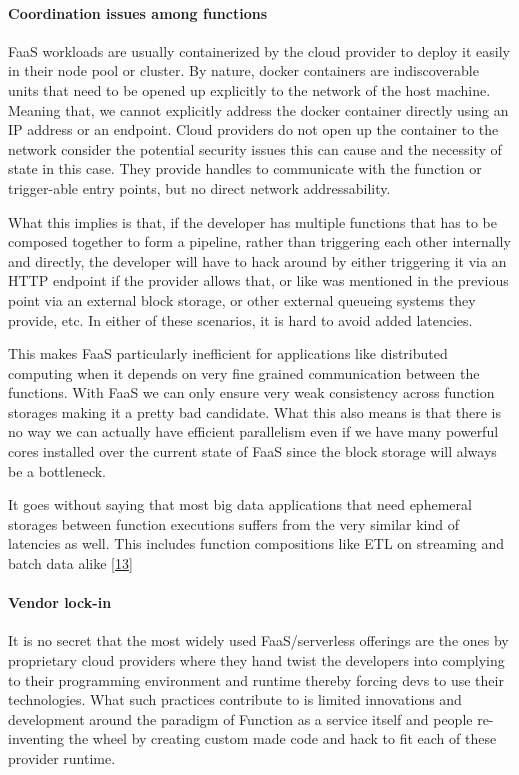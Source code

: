 \documentclass[12pt,titlepage]{article}
\begin{document}
\paragraph{Coordination issues among functions}
\label{sec:orgab8bd36}
FaaS workloads are usually containerized by
the cloud provider to deploy it easily in their node pool or cluster. By nature,
docker containers are indiscoverable units that need to be opened up explicitly
to the network of the host machine. Meaning that, we cannot explicitly address
the docker container directly using an IP address or an endpoint. Cloud
providers do not open up the container to the network consider the potential
security issues this can cause and the necessity of state in this case. They
provide handles to communicate with the function or trigger-able entry points,
but no direct network addressability.

What this implies is that, if the developer has multiple functions that has to
be composed together to form a pipeline, rather than triggering each other
internally and directly, the developer will have to hack around by either
triggering it via an HTTP endpoint if the provider allows that, or like was
mentioned in the previous point via an external block storage, or other external
queueing systems they provide, etc. In either of these
scenarios, it is hard to avoid added latencies.

This makes FaaS particularly inefficient for applications like distributed
computing when it depends on very fine grained communication between the
functions. With FaaS we can only ensure very weak consistency across function
storages making it a pretty bad candidate. What this also means is that there is
no way we can actually have efficient parallelism even if we have many powerful
cores installed over the current state of FaaS since the block storage will
always be a bottleneck.

It goes without saying that most big data applications that need ephemeral
storages between function executions suffers from the very similar kind of
latencies as well. This includes function compositions like ETL on streaming and
batch data alike \hyperref[ref:13]{[13}]

\paragraph{Vendor lock-in}
\label{sec:org3ed5e38}
It is no secret that the most widely used FaaS/serverless offerings are the ones by
proprietary cloud providers where they hand twist the developers into complying
to their programming environment and runtime thereby forcing devs to use their
technologies. What such practices contribute to is limited innovations and
development around the paradigm of Function as a service itself and people
re-inventing the wheel by creating custom made code and hack to fit each of
these provider runtime.
\end{document}
